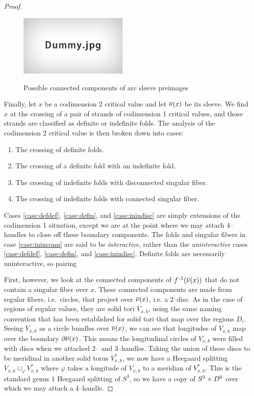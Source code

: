 \begin{proof}
{{	\begin{figure}
		\centering
		\caption{Possible connected components of arc sleeve preimages}
		\includegraphics[height=3cm]{figures/dummy.jpg}
		\label{fig:arcsleevepre}
	\end{figure}
	
	Finally, let $x$ be a codimension 2 critical value and let $\overline{\nu}(x)$ be its sleeve.
	We find $x$ at the crossing of a pair of strands of codimension 1 critical values, and those strands are classified as definite or indefinite folds.
	The analysis of the codimension 2 critical value is then broken down into cases:
	\begin{enumerate}[label=(\alph*)]
		\item \label{case:defdef} The crossing of definite folds.
		\item \label{case:defin} The crossing of a definite fold with an indefinite fold.
		\item \label{case:inindisc} The crossing of indefinite folds with disconnected singular fiber.
		\item \label{case:ininconn} The crossing of indefinite folds with connected singular fiber.
	\end{enumerate}
	Cases \ref{case:defdef}, \ref{case:defin}, and \ref{case:inindisc} are simply extensions of the codimension 1 situation, except we are at the point where we may attach 4--handles to close off these boundary components.
	The folds and singular fibers in case \ref{case:ininconn} are said to be \emph{interactive}, rather than the \emph{uninteractive} cases \ref{case:defdef}, \ref{case:defin}, and \ref{case:inindisc}.
	Definite folds are necessarily uninteractive, so pairing 
	
	First, however, we look at the connected components of $f^{\,\text{-}1}(\overline{\nu}(x))$ that do not contain a singular fiber over $x$.
	These connected components are made from regular fibers, i.e.\ circles, that project over $\overline{\nu}(x)$, i.e. a 2--disc.
	As in the case of regions of regular values, they are solid tori $V_{x,k}$, using the same naming convention that has been established for solid tori that map over the regions $D_i$.
	Seeing $V_{x,k}$ as a circle bundles over $\overline{\nu}(x)$, we can see that longitudes of $V_{x,k}$ map over the boundary $\partial\overline{\nu}(x)$.
	This means the longitudinal circles of $V_{x,k}$ were filled with discs when we attached 2-- and 3--handles.
	Taking the union of these discs to be meridinal in another solid torus $V_{x,k}^*$, we now have a Heegaard splitting $V_{x,k}\cup_\varphi V_{x,k}^*$ where $\varphi$ takes a longitude of $V_{x,k}$ to a meridian of $V_{x,k}^*$.
	This is the standard genus 1 Heegaard splitting of $S^3$, so we have a copy of $S^3\times D^0$ over which we may attach a 4--handle.

}}
\end{proof}
